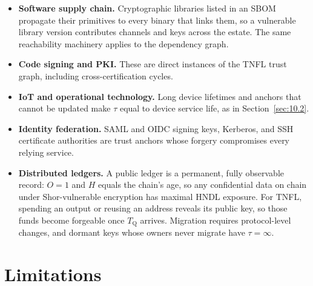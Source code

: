 \documentclass[conference]{IEEEtran}
\newcommand{\Tq}{T_{\mathrm{Q}}}
\begin{document}
\begin{itemize}
\item \textbf{Software supply chain.} Cryptographic libraries listed in an SBOM propagate their primitives to every binary that links them, so a vulnerable library version contributes channels and keys across the estate. The same reachability machinery applies to the dependency graph.
\item \textbf{Code signing and PKI.} These are direct instances of the TNFL trust graph, including cross-certification cycles.
\item \textbf{IoT and operational technology.} Long device lifetimes and anchors that cannot be updated make $\tau$ equal to device service life, as in Section~\ref{sec:10.2}.
\item \textbf{Identity federation.} SAML and OIDC signing keys, Kerberos, and SSH certificate authorities are trust anchors whose forgery compromises every relying service.
\item \textbf{Distributed ledgers.} A public ledger is a permanent, fully observable record: $O = 1$ and $H$ equals the chain's age, so any confidential data on chain under Shor-vulnerable encryption has maximal HNDL exposure. For TNFL, spending an output or reusing an address reveals its public key, so those funds become forgeable once $\Tq$ arrives. Migration requires protocol-level changes, and dormant keys whose owners never migrate have $\tau = \infty$.
\end{itemize}

\section{Limitations}\label{sec:12}
\end{document}
